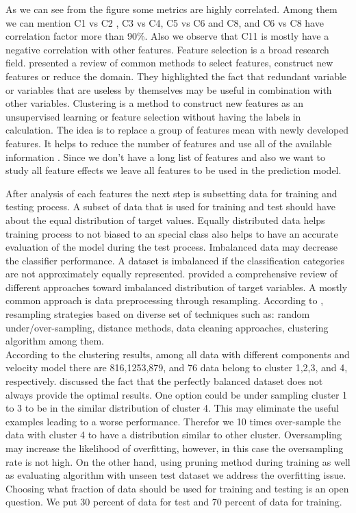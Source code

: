 As we can see from the figure some metrics are highly correlated. Among them we can mention C1 vs C2 , C3 vs C4, C5 vs C6 and C8, and C6 vs C8 have correlation factor more than 90\%. Also we observe that C11 is mostly have a negative correlation with other features. Feature selection is a broad research field. \citet{Guyon_2003} presented a review of common methods to select features, construct new features or reduce the domain. They highlighted the fact that redundant variable or variables that are useless by themselves may be useful in combination with other variables. Clustering is a method to construct new features as an unsupervised learning or feature selection without having the labels in calculation. The idea is to replace a group of features mean with newly developed features. It helps to reduce the number of features and use all of the available information \citep{Duda_1973,Guyon_2003}. Since we don't have a long list of features and also we want to study all feature effects we leave all features to be used in the prediction model. 

After analysis of each features the next step is subsetting data for training and testing process. A subset of data that is used for training and test should have about the equal distribution of target values. Equally distributed data helps training process to not biased to an special class also helps to have an accurate evaluation of the model during the test process. Imbalanced data may decrease the classifier performance. A dataset is imbalanced if the classification categories are not approximately equally represented. \citet{Branco_2015} provided a comprehensive review of different approaches toward imbalanced distribution of target variables. A mostly common approach is data preprocessing through resampling. According to \citet{Branco_2015}, resampling strategies based on diverse set of techniques such as: random under/over-sampling, distance methods, data cleaning approaches, clustering algorithm among them.\\
According to the clustering results, among all data with different components and velocity model there are 816,1253,879, and 76 data belong to cluster 1,2,3, and 4, respectively. \citet{Weiss_2003} discussed the fact that the perfectly balanced dataset does not always provide the optimal results. One option could be under sampling cluster 1 to 3 to be in the similar distribution of cluster 4. This may eliminate the useful examples leading to a worse performance. Therefor we 10 times over-sample the data with cluster 4 to have a distribution similar to other cluster. Oversampling may increase the likelihood of overfitting, however, in this case the oversampling rate is not high. On the other hand, using pruning method during training as well as evaluating algorithm with unseen test dataset we address the overfitting issue.  Choosing what fraction of data should be used for training and testing is an open question. We put 30 percent of data for test and 70 percent of data for training. 

